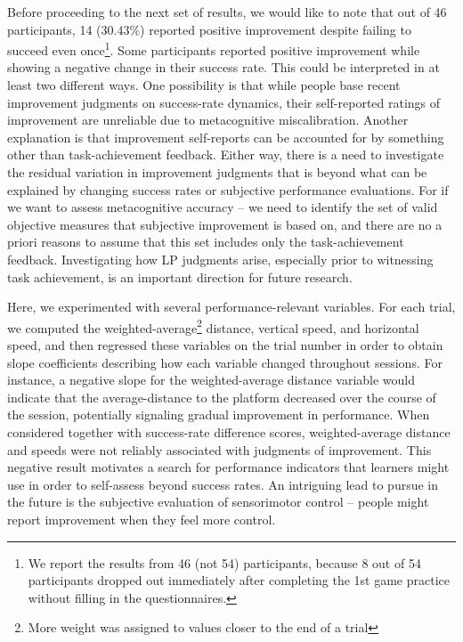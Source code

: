 Before proceeding to the next set of results, we would like to note that out of 46 participants, 14 ($30.43\%$) reported positive improvement despite failing to succeed even once\footnote{We report the results from 46 (not 54) participants, because 8 out of 54 participants dropped out immediately after completing the 1st game practice without filling in the questionnaires.}. Some participants reported positive improvement while showing a negative change in their success rate. This could be interpreted in at least two different ways. One possibility is that while people base recent improvement judgments on success-rate dynamics, their self-reported ratings of improvement are unreliable due to metacognitive miscalibration. Another explanation is that improvement self-reports can be accounted for by something other than task-achievement feedback. Either way, there is a need to investigate the residual variation in improvement judgments that is beyond what can be explained by changing success rates or subjective performance evaluations. For if we want to assess metacognitive accuracy -- we need to identify the set of valid objective measures that subjective improvement is based on, and there are no a priori reasons to assume that this set includes only the task-achievement feedback. Investigating how \ac{LP} judgments arise, especially prior to witnessing task achievement, is an important direction for future research.

Here, we experimented with several performance-relevant variables. For each trial, we computed the weighted-average\footnote{More weight was assigned to values closer to the end of a trial} distance, vertical speed, and horizontal speed, and then regressed these variables on the trial number in order to obtain slope coefficients describing how each variable changed throughout sessions. For instance, a negative slope for the weighted-average distance variable would indicate that the average-distance to the platform decreased over the course of the session, potentially signaling gradual improvement in performance. When considered together with success-rate difference scores, weighted-average distance and speeds were not reliably associated with judgments of improvement. This negative result motivates a search for performance indicators that learners might use in order to self-assess beyond success rates. An intriguing lead to pursue in the future is the subjective evaluation of sensorimotor control -- people might report improvement when they feel more control. 

